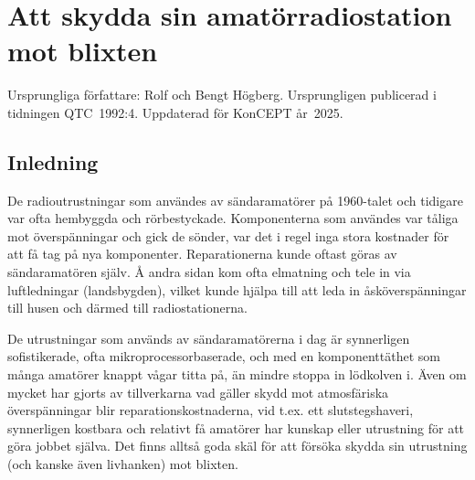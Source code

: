 \chapter{Att skydda sin amatörradiostation mot blixten}
\label{app:aaskskydd}

Ursprungliga författare: Rolf och Bengt Högberg.
Ursprungligen publicerad i tidningen QTC~1992:4.
Uppdaterad för KonCEPT år~2025.

\section{Inledning}
De radioutrustningar som användes av sändaramatörer på 1960-talet och tidigare
var ofta hembyggda och rörbestyckade.
Komponenterna som användes var tåliga mot överspänningar och gick de sönder, var
det i regel inga stora kostnader för att få tag på nya komponenter.
Reparationerna kunde oftast göras av sändaramatören själv.
Å andra sidan kom ofta elmatning och tele in via luftledningar (landsbygden),
vilket kunde hjälpa till att leda in åsköverspänningar till husen och därmed
till radiostationerna.

De utrustningar som används av sändaramatörerna i dag är synnerligen
sofistikerade, ofta mikroprocessorbaserade, och med en komponenttäthet som många
amatörer knappt vågar titta på, än mindre stoppa in lödkolven i.
Även om mycket har gjorts av tillverkarna vad gäller skydd mot atmosfäriska
överspänningar blir reparationskostnaderna, vid t.ex. ett slutstegshaveri,
synnerligen kostbara och relativt få amatörer har kunskap eller utrustning för
att göra jobbet själva.
Det finns alltså goda skäl för att försöka skydda sin utrustning (och kanske
även livhanken) mot blixten.


